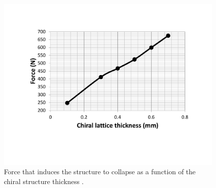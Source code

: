       \begin{figure}[!htpb] %
        \centering
        \includegraphics[width=0.8 \textwidth]{../figures/result-sim/chiral_t/force_chiral_t}
        \caption[Force that induces the structure to collapse as a function of the chiral structure thickness]{Force that induces the structure to collapse as a function of the chiral structure thickness \chit.}\label{fig:force_chiral_t}
      \end{figure} 